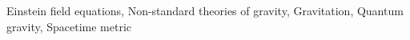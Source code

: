 \documentclass[twocolumn]{aastex631}
\begin{document}
Einstein field equations, Non-standard theories of gravity, Gravitation, Quantum gravity, Spacetime metric
\end{document}
